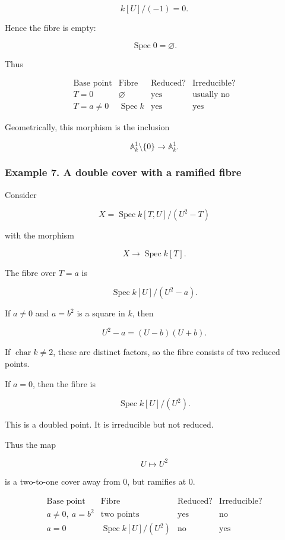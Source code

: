 \documentclass[12pt,a4paper]{article}
\theoremstyle{notespace}
\begin{document}
\[
k[U]/(-1)=0.
\]

Hence the fibre is empty:

\[
\operatorname{Spec}0=\varnothing.
\]

Thus

\[
\begin{array}{c|c|c|c}
	\text{Base point} & \text{Fibre} & \text{Reduced?} & \text{Irreducible?} \\
	\hline
	T=0 & \varnothing & \text{yes} & \text{usually no} \\
	T=a\neq 0 & \operatorname{Spec}k & \text{yes} & \text{yes}
\end{array}
\]

Geometrically, this morphism is the inclusion

\[
\mathbb{A}^1_k\setminus\{0\}\to \mathbb{A}^1_k.
\]

\subsubsection{Example 7. A double cover with a ramified fibre}

Consider

\[
X=\operatorname{Spec}k[T,U]/(U^2-T)
\]

with the morphism

\[
X\to \operatorname{Spec}k[T].
\]

The fibre over \(T=a\) is

\[
\operatorname{Spec}k[U]/(U^2-a).
\]

If \(a\neq 0\) and \(a=b^2\) is a square in \(k\), then

\[
U^2-a=(U-b)(U+b).
\]

If \(\operatorname{char}k\neq 2\), these are distinct factors, so the fibre consists of two reduced points.

If \(a=0\), then the fibre is

\[
\operatorname{Spec}k[U]/(U^2).
\]

This is a doubled point. It is irreducible but not reduced.

Thus the map

\[
U\mapsto U^2
\]

is a two-to-one cover away from \(0\), but ramifies at \(0\).

\[
\begin{array}{c|c|c|c}
	\text{Base point} & \text{Fibre} & \text{Reduced?} & \text{Irreducible?} \\
	\hline
	a\neq 0,\ a=b^2 & \text{two points} & \text{yes} & \text{no} \\
	a=0 & \operatorname{Spec}k[U]/(U^2) & \text{no} & \text{yes}
\end{array}
\]
\end{document}
